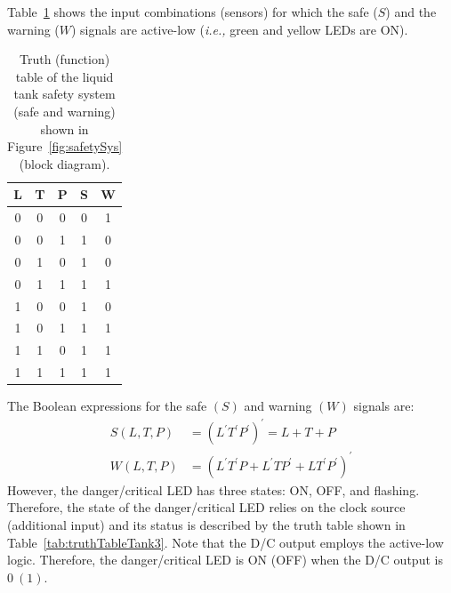 %
%
Table~\ref{tab:truthTableTank2} shows the input combinations (sensors) for which  the  safe ($S$) and the warning ($W$) signals are active-low (\textit{i.e.,} green and yellow LEDs are ON). %
%
\begin{table}  
  \centering
  \caption{Truth (function) table of the liquid tank safety system (safe and warning) shown in Figure~\ref{fig:safetySys} (block diagram).}  
  \begin{tabular}{ccc|c|c}
    \toprule
    L & T & P & S & W\\
    \toprule
    0 & 0 & 0 & 0 & 1\\
    0 & 0 & 1 & 1 & 0\\
    0 & 1 & 0 & 1 & 0\\
    0 & 1 & 1 & 1 & 1\\
    1 & 0 & 0 & 1 & 0\\
    1 & 0 & 1 & 1 & 1\\
    1 & 1 & 0 & 1 & 1\\
    1 & 1 & 1 & 1 & 1\\
    \bottomrule
  \end{tabular}
  \label{tab:truthTableTank2}
\end{table}
%
The Boolean expressions for the safe $(S)$ and warning $(W)$ signals are: %
%
\begin{subequations}
\begin{align}
  \label{eq:S-AL}
  S(L,T,P) &= (L^{'}T^{'}P^{'})^{'} = L+T+P\\
    \label{eq:W-AL}
  W(L,T,P) &= (L^{'}T^{'}P + L^{'}TP^{'}+LT^{'}P^{'})^{'}
\end{align}  
\end{subequations}
%
However, the danger/critical LED has three states: ON, OFF, and flashing. Therefore, the state of the danger/critical LED relies on  the clock source (additional input) and its status is described by the truth table shown in Table~\ref{tab:truthTableTank3}. Note that the D/C output  employs the active-low logic. Therefore, the danger/critical  LED is ON (OFF) when the  D/C output  is $0~(1).$

